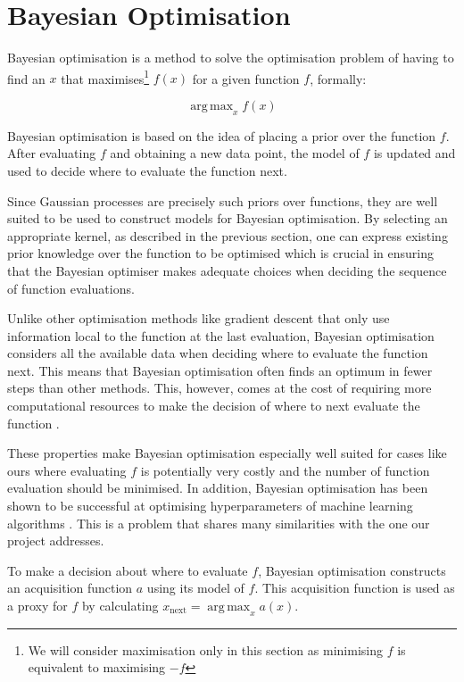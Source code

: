 \documentclass[a4paper,12pt,twoside,openright]{report}
\DeclareMathOperator*{\argmax}{arg\,max}
\begin{document}
\section{Bayesian Optimisation}
Bayesian optimisation is a method to solve the optimisation problem of having to find an $x$ that maximises\footnote{We will consider maximisation only in this section as minimising $f$ is equivalent to maximising $-f$} $f(x)$ for a given function $f$, formally: 

\begin{equation}
\argmax_x f(x)
\end{equation}

Bayesian optimisation is based on the idea of placing a prior over the function $f$. After evaluating $f$ and obtaining a new data point, the model of $f$ is updated and used to decide where to evaluate the function next.

Since Gaussian processes are precisely such priors over functions, they are well suited to be used to construct models for Bayesian optimisation. By selecting an appropriate kernel, as described in the previous section, one can express existing prior knowledge over the function to be optimised which is crucial in ensuring that the Bayesian optimiser makes adequate choices when deciding the sequence of function evaluations.

Unlike other optimisation methods like gradient descent that only use information local to the function at the last evaluation, Bayesian optimisation considers all the available data when deciding where to evaluate the function next. This means that Bayesian optimisation often finds an optimum in fewer steps than other methods. This, however, comes at the cost of requiring more computational resources to make the decision of where to next evaluate the function \cite{PracticalBayesianOptimization}.

These properties make Bayesian optimisation especially well suited for cases like ours where evaluating $f$ is potentially very costly and the number of function evaluation should be minimised. In addition, Bayesian optimisation has been shown to be successful at optimising hyperparameters of machine learning algorithms \cite{PracticalBayesianOptimization}. This is a problem that shares many similarities with the one our project addresses.

To make a decision about where to evaluate $f$, Bayesian optimisation constructs an acquisition function $a$ using its model of $f$. This acquisition function is used as a proxy for $f$ by calculating $x_{\text{next}} = \argmax_x a(x)$.
\end{document}
